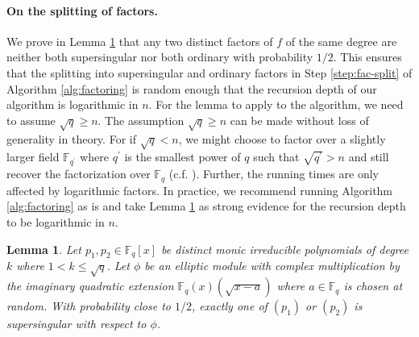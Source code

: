 \documentclass[12pt]{article}
\theoremstyle{plain}
\newtheorem{lemma}[theorem]{Lemma}
\theoremstyle{definition}
\def\F{\ensuremath{\mathbb{F}}}
\begin{document}
\paragraph{On the splitting of factors.}
We prove in Lemma \ref{splitting_lemma} that any two distinct factors of $f$ of the same degree are 
neither both supersingular nor both ordinary with probability $1/2$. This ensures that the 
splitting into supersingular and ordinary factors in Step \ref{step:fac-split} of Algorithm 
\ref{alg:factoring} is random enough that the recursion depth of our algorithm is logarithmic 
in $n$. For the lemma to apply to the algorithm, we need to assume $\sqrt{q} \ge n$.  The 
assumption $\sqrt{q} \ge  n$ can be made without loss of generality in theory. For if $\sqrt{q} < 
n$, we might choose to factor over a slightly larger field $\F_{q^\prime}$ where $q^\prime$ is the 
smallest power of $q$ such that $\sqrt{q^\prime} > n$ and still recover the factorization over 
$\F_q$ (c.f. \cite[Remark 3.2]{nar}). Further, the running times are only affected by logarithmic 
factors. In practice, we recommend running Algorithm \ref{alg:factoring} as is and take Lemma 
\ref{splitting_lemma} as strong evidence for the recursion depth to be logarithmic in $n$.
\begin{lemma}
	\label{splitting_lemma}
	Let $p_1,p_2 \in \F_q[x]$ be distinct monic irreducible polynomials of degree $k$ where $1 < k 
	\le \sqrt{q}$. Let $\phi$ be an elliptic module with complex multiplication by the imaginary 
	quadratic extension $\F_q(x)(\sqrt{x-a})$ where $a \in \F_q$ is chosen at random. With 
	probability close to $1/2$, exactly one of $(p_1)$ or $(p_2)$ is supersingular with respect to 
	$\phi$.
\end{lemma}
\end{document}
